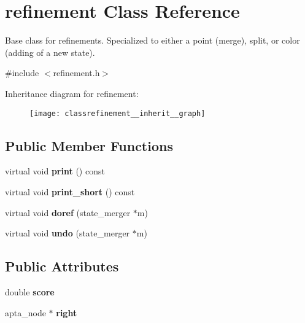 \hypertarget{classrefinement}{}\section{refinement Class Reference}
\label{classrefinement}


Base class for refinements. Specialized to either a point (merge), split, or color (adding of a new state).  




{\ttfamily \#include $<$refinement.\+h$>$}



Inheritance diagram for refinement\+:
\nopagebreak
\begin{figure}[H]
\begin{center}
\leavevmode
\texttt{[image: classrefinement\_\_inherit\_\_graph]}
\end{center}
\end{figure}
\subsection*{Public Member Functions}
\begin{DoxyCompactItemize}
\item 
virtual void {\bfseries print} () const \hypertarget{classrefinement_a0ee933176436975fb05a2edb04ebd819}{}\label{classrefinement_a0ee933176436975fb05a2edb04ebd819}

\item 
virtual void {\bfseries print\+\_\+short} () const \hypertarget{classrefinement_a46046c9842832db4cd5a9310972dd898}{}\label{classrefinement_a46046c9842832db4cd5a9310972dd898}

\item 
virtual void {\bfseries doref} (state\+\_\+merger $\ast$m)\hypertarget{classrefinement_a3927f962be48969209071fff60a92e6d}{}\label{classrefinement_a3927f962be48969209071fff60a92e6d}

\item 
virtual void {\bfseries undo} (state\+\_\+merger $\ast$m)\hypertarget{classrefinement_a77bfd65c7d57546bfeb04ba7dacbf066}{}\label{classrefinement_a77bfd65c7d57546bfeb04ba7dacbf066}

\end{DoxyCompactItemize}
\subsection*{Public Attributes}
\begin{DoxyCompactItemize}
\item 
double {\bfseries score}\hypertarget{classrefinement_a024cfbac56c02c168736c38f17f0a197}{}\label{classrefinement_a024cfbac56c02c168736c38f17f0a197}

\item 
apta\+\_\+node $\ast$ {\bfseries right}\hypertarget{classrefinement_a60169bd9df35b3a61404395da1e09b05}{}\label{classrefinement_a60169bd9df35b3a61404395da1e09b05}

\end{DoxyCompactItemize}


